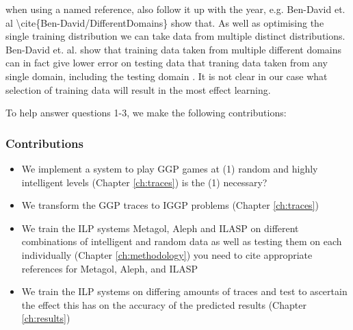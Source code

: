 \ac{when using a named reference, also follow it up with the year, e.g. Ben-David et. al \cite{Ben-David/DifferentDomains} show that.}
As well as optimising the single training distribution we can take data from multiple distinct distributions. Ben-David et. al. show that training data taken from multiple different domains can in fact give lower error on testing data that traning data taken from any single domain, including the testing domain \cite{Ben-David/DifferentDomains}. It is not clear in our case what selection of training data will result in the most effect learning.

To help answer questions 1-3, we make the following contributions:

\subsubsection{Contributions}
\begin{itemize}
\item We implement a system to play GGP games at (1) random and highly intelligent levels (Chapter \ref{ch:traces})
\ac{is the (1) necessary?}

\item We transform the GGP traces to IGGP problems (Chapter \ref{ch:traces})
\item We train the ILP systems Metagol, Aleph and ILASP on different combinations of intelligent and random data as well as testing them on each individually (Chapter \ref{ch:methodology}) \ac{you need to cite appropriate references for Metagol, Aleph, and ILASP}
\item We train the ILP systems on differing amounts of traces and test to ascertain the effect this has on the accuracy of the predicted results (Chapter \ref{ch:results})
\end{itemize}